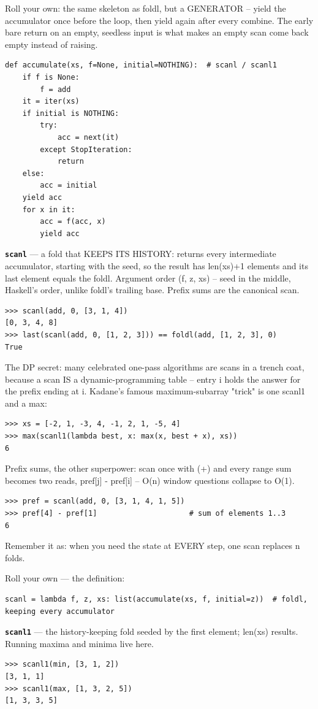 \documentclass[10pt,letterpaper]{article}
\begin{document}
Roll your own: the same skeleton as foldl, but a GENERATOR -- yield the accumulator once before the loop, then yield again after every combine. The early bare return on an empty, seedless input is what makes an empty scan come back empty instead of raising.

\begin{lstlisting}[style=ex]
def accumulate(xs, f=None, initial=NOTHING):  # scanl / scanl1
    if f is None:
        f = add
    it = iter(xs)
    if initial is NOTHING:
        try:
            acc = next(it)
        except StopIteration:
            return
    else:
        acc = initial
    yield acc
    for x in it:
        acc = f(acc, x)
        yield acc
\end{lstlisting}
\textbf{\texttt{scanl}} --- a fold that KEEPS ITS HISTORY: returns every intermediate accumulator, starting with the seed, so the result has len(xs)+1 elements and its last element equals the foldl. Argument order (f, z, xs) -- seed in the middle, Haskell's order, unlike foldl's trailing base. Prefix sums are the canonical scan.
\begin{lstlisting}[style=ex]
>>> scanl(add, 0, [3, 1, 4])
[0, 3, 4, 8]
>>> last(scanl(add, 0, [1, 2, 3])) == foldl(add, [1, 2, 3], 0)
True
\end{lstlisting}

The DP secret: many celebrated one-pass algorithms are scans in a trench coat, because a scan IS a dynamic-programming table -- entry i holds the answer for the prefix ending at i. Kadane's famous maximum-subarray "trick" is one scanl1 and a max:

\begin{lstlisting}[style=ex]
>>> xs = [-2, 1, -3, 4, -1, 2, 1, -5, 4]
>>> max(scanl1(lambda best, x: max(x, best + x), xs))
6
\end{lstlisting}

Prefix sums, the other superpower: scan once with (+) and every range sum becomes two reads, pref[j] - pref[i] -- O(n) window questions collapse to O(1).

\begin{lstlisting}[style=ex]
>>> pref = scanl(add, 0, [3, 1, 4, 1, 5])
>>> pref[4] - pref[1]                     # sum of elements 1..3
6
\end{lstlisting}

Remember it as: when you need the state at EVERY step, one scan replaces n folds.


Roll your own --- the definition:

\begin{lstlisting}[style=ex]
scanl = lambda f, z, xs: list(accumulate(xs, f, initial=z))  # foldl, keeping every accumulator
\end{lstlisting}
\textbf{\texttt{scanl1}} --- the history-keeping fold seeded by the first element; len(xs) results. Running maxima and minima live here.
\begin{lstlisting}[style=ex]
>>> scanl1(min, [3, 1, 2])
[3, 1, 1]
>>> scanl1(max, [1, 3, 2, 5])
[1, 3, 3, 5]
\end{lstlisting}
\end{document}
